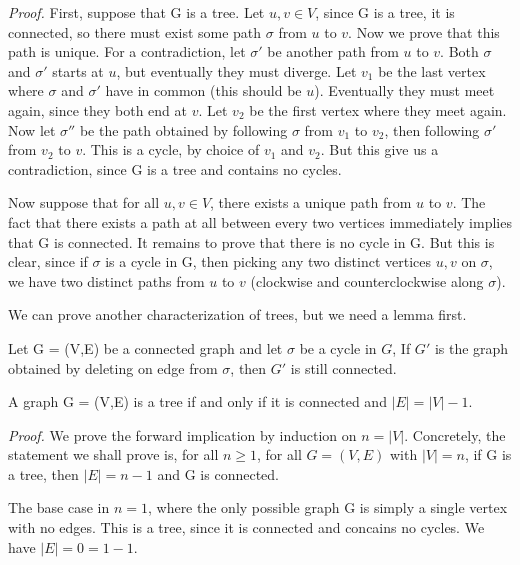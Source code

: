 \documentclass{tufte-handout}
\begin{document}
\textit{Proof.} First, suppose that G is a tree. Let \( u,v \in V \),
since G is a tree, it is connected, so there must exist some path \(\sigma\) from \( u \) to \( v \).
Now we prove that this path is unique. For a contradiction, let \(\sigma'\) be another path from \( u \) to \( v \).
Both \(\sigma\) and \(\sigma'\) starts at \( u \), but eventually they must diverge.
Let \(v_1\) be the last vertex where \(\sigma\) and \(\sigma'\) have in common (this should be \( u \)).
Eventually they must meet again, since they both end at \( v \). Let \( v_2 \) be the first vertex where they meet again.
Now let \(\sigma''\) be the path obtained by following \(\sigma\) from \( v_1 \) to \( v_2 \), then following
\(\sigma'\) from \( v_2 \) to \( v \). This is a cycle, by choice of \( v_1 \) and \( v_2 \).
But this give us a contradiction, since G is a tree and contains no cycles. 

Now suppose that for all \( u,v \in V \), there exists a unique path from \( u \) to \( v \).
The fact that there exists a path at all between every two vertices immediately implies that G is connected.
It remains to prove that there is no cycle in G. But this is clear, since if
\(\sigma\) is a cycle in G, then picking any two distinct vertices \( u,v \) on \(\sigma\),
we have two distinct paths from \( u \) to \( v \) (clockwise and counterclockwise along \(\sigma\)). \qedsymbol

We can prove another characterization of trees, but we need a lemma first.

\begin{Lemma}
    Let G = (V,E) be a connected graph and let \(\sigma\) be a cycle in \( G \),
    If \( G' \) is the graph obtained by deleting on edge from \(\sigma\), then \( G' \) is still connected.
\end{Lemma}

\begin{Lemma}
    A graph G = (V,E) is a tree if and only if it is connected and \(\left|E\right| = \left|V\right|-1\).
\end{Lemma}

\textit{Proof.} We prove the forward implication by induction on \( n = \left|V\right| \).
Concretely, the statement we shall prove is, for all \(n \geq 1\), for all \(G = (V,E)\) with \(\left|V\right| = n\),
if G is a tree, then \(\left|E\right| = n-1\) and G is connected.

The base case in \( n=1 \), where the only possible graph G is simply a single vertex with no edges.
This is a tree, since it is connected and concains no cycles. We have \(\left|E\right| = 0 = 1-1\).
\end{document}
